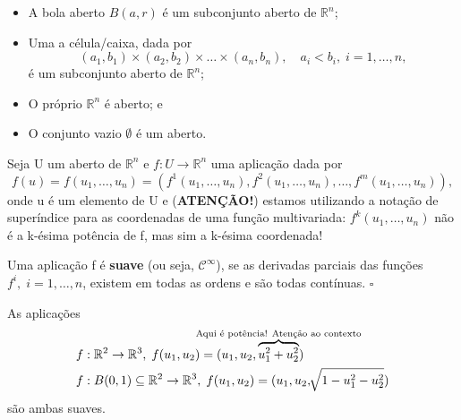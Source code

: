 \documentclass[../differential_geometry.tex]{subfiles}
\begin{document}
\begin{example}
	\begin{itemize}
		\item[1)] A bola aberto \(B(a, r)\) é um subconjunto aberto de \(\mathbb{R}^{n}\);
		\item[2)] Uma a célula/caixa, dada por
		      \[
			      (a_1, b_1)\times (a_2, b_2)\times \dotsc \times (a_{n}, b_{n}), \quad a_{i}<b_{i},\; i=1,\dotsc ,n,
		      \]
		      é um subconjunto aberto de \(\mathbb{R}^{n}\);
		\item[3)] O próprio \(\mathbb{R}^{n}\) é aberto; e
		\item[4)] O conjunto vazio \(\emptyset \) é um aberto.
	\end{itemize}
\end{example}

Seja U um aberto de \(\mathbb{R}^{n}\) e \(f:U\rightarrow \mathbb{R}^{n}\) uma aplicação dada por
\[
	f(u)=f(u_1,\dotsc ,u_{n})=(f^{1}(u_1,\dotsc ,u_{n}), f^{2}(u_1,\dotsc , u_{n}), \dotsc , f^{m}(u_1,\dotsc ,u_{n})),
\]
onde u é um elemento de U e (\textbf{ATENÇÃO!}) estamos utilizando a notação de superíndice para as coordenadas de uma função multivariada: \(f^{k}(u_1,\dotsc , u_{n})\) não é a k-ésima potência de f, mas sim a k-ésima coordenada!
\begin{def*}
	Uma aplicação f é \textbf{suave} (ou seja, \(\mathcal{C}^{\infty}\)), se as derivadas parciais das funções \(f^{i},\; i=1,\dotsc ,n\), existem em todas as ordens e são todas contínuas. \(\square\)
\end{def*}
\begin{example}
	As aplicações
	\begin{align*}
		 & f:\mathbb{R}^{2}\rightarrow \mathbb{R}^{3},\; f(u_1, u_2)=(u_1, u_2, \overbrace{u_{1}^{2}+u_{2}^{2}}^{\mathclap{\text{Aqui é potência! Atenção ao contexto}}}) \\
		 & f:B(0,1)\subseteq \mathbb{R}^{2}\rightarrow \mathbb{R}^{3},\; f(u_1, u_2)=(u_1, u_2, \sqrt[]{1-u_{1}^{2}-u_{2}^{2}})
	\end{align*}
	são ambas suaves.
\end{example}
\end{document}
